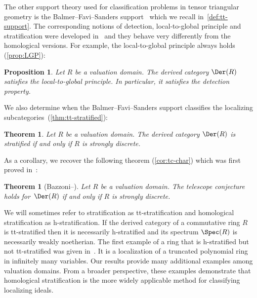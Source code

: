 \documentclass{amsart}
\numberwithin{equation}{section}%
\newtheorem{Thm}[equation]{Theorem}
\newtheorem{Prop}[equation]{Proposition}
\theoremstyle{remark}
\begin{document}
The other support theory used for classification problems in tensor triangular geometry is the Balmer--Favi--Sanders support~\cite{BalmerFavi11,BillySanders17pp} which we recall in~\cref{def:tt-support}. The corresponding notions of detection, local-to-global principle and stratification were developed in~\cite{BarthelHeardSanders23a,Zou25} and they behave very differently from the homological versions. For example, the local-to-global principle always holds (\cref{prop:LGP}):

\begin{Prop}\label{prop:intro-LGP}
	Let $R$ be a valuation domain. The derived category $\Der(R)$ satisfies the local-to-global principle. In particular, it satisfies the detection property.
\end{Prop}

We also determine when the Balmer--Favi--Sanders support classifies the localizing subcategories~(\cref{thm:tt-stratified}):

\begin{Thm}\label{thm:intro-tt-stratified}
	Let $R$ be a valuation domain. The derived category $\Der(R)$ is stratified if and only if $R$ is strongly discrete.
\end{Thm}
 
As a corollary, we recover the following theorem (\cref{cor:tc-char}) which was first proved in~\cite[Theorem~7.2]{BazzoniStovicek17}:

\begin{Thm}[Bazzoni--\Stovicek]\label{thm:intro-telescope}
	Let $R$ be a valuation domain. The telescope conjecture holds for~$\Der(R)$ if and only if $R$ is strongly discrete.
\end{Thm}

We will sometimes refer to stratification as tt-stratification and homological stratification as h-stratification. If the derived category of a commutative ring $R$ is tt-stratified then it is necessarily h-stratified and its spectrum $\Spec(R)$ is necessarily weakly noetherian. The first example of a ring that is h-stratified but not tt-stratified was given in~\cite[Section~3]{BalchinGomezStevenson26pp}. It is a localization of a truncated polynomial ring in infinitely many variables. Our results provide many additional examples among valuation domains. From a broader perspective, these examples demonstrate that homological stratification is the more widely applicable method for classifying localizing ideals.
\end{document}
